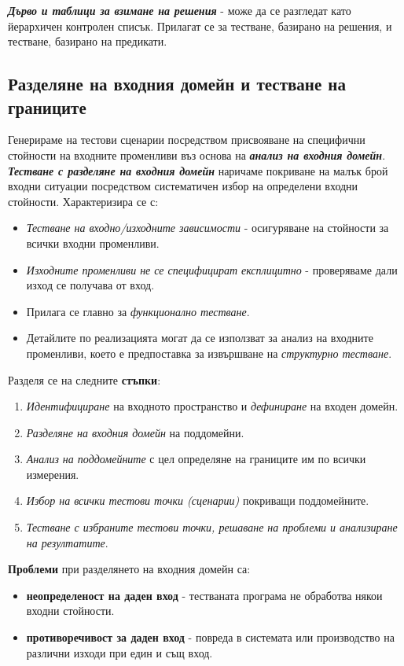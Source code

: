 \documentclass[fleqn,12pt]{article}
\begin{document}
\textbf{\textit{Дърво и таблици за взимане на решения}} - може да се разгледат като йерархичен контролен списък.
Прилагат се за тестване, базирано на решения, и тестване, базирано на предикати.

\subsection{Разделяне на входния домейн и тестване на границите}

Генерираме на тестови сценарии посредством присвояване на специфични стойности на входните променливи въз основа на \textbf{\textit{анализ на входния домейн}}.
\bigbreak
\textbf{\textit{Тестване с разделяне на входния домейн}} наричаме покриване на малък брой входни ситуации посредством систематичен избор на определени входни стойности.
Характеризира се с:
\begin{itemize}
    \item \textit{Тестване на входно/изходните зависимости} - осигуряване на стойности за всички входни променливи.
    \item \textit{Изходните променливи не се специфицират експлицитно} - проверяваме дали изход се получава от вход.
    \item Прилага се главно за \textit{функционално тестване}.
    \item Детайлите по реализацията могат да се използват за анализ на входните променливи, което е предпоставка за извършване на \textit{структурно тестване}.
\end{itemize}

Разделя се на следните \textbf{стъпки}:
\begin{enumerate}
    \item \textit{Идентифициране} на входното пространство и \textit{дефиниране} на входен домейн.
    \item \textit{Разделяне на входния домейн} на поддомейни.
    \item \textit{Анализ на поддомейните} с цел определяне на границите им по всички измерения.
    \item \textit{Избор на всички тестови точки (сценарии)} покриващи поддомейните.
    \item \textit{Тестване с избраните тестови точки, решаване на проблеми и анализиране на резултатите}.
\end{enumerate}

\textbf{Проблеми} при разделянето на входния домейн са:
\begin{itemize}
    \item \textbf{неопределеност на даден вход} - тестваната програма не обработва някои входни стойности.
    \item \textbf{противоречивост за даден вход} - повреда в системата или производство на различни изходи при един и същ вход.
\end{itemize}
\end{document}

